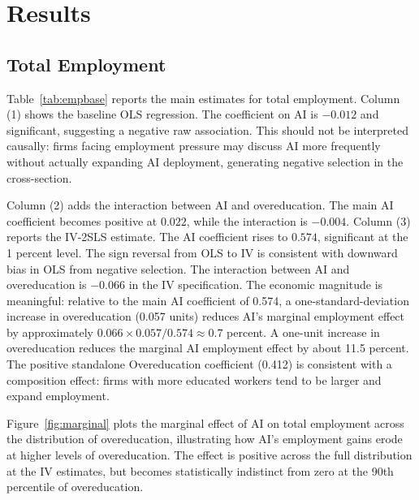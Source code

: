 \documentclass[12pt,a4paper]{article}
\theoremstyle{predstyle}
\theoremstyle{plain}
\begin{document}
\section{Results}
\label{sec:results}

\subsection{Total Employment}

Table~\ref{tab:empbase} reports the main estimates for total employment. Column (1) shows the baseline OLS regression. The coefficient on AI is \(-0.012\) and significant, suggesting a negative raw association. This should not be interpreted causally: firms facing employment pressure may discuss AI more frequently without actually expanding AI deployment, generating negative selection in the cross-section.

Column (2) adds the interaction between AI and overeducation. The main AI coefficient becomes positive at \(0.022\), while the interaction is \(-0.004\). Column (3) reports the IV-2SLS estimate. The AI coefficient rises to \(0.574\), significant at the 1 percent level. The sign reversal from OLS to IV is consistent with downward bias in OLS from negative selection. The interaction between AI and overeducation is \(-0.066\) in the IV specification. The economic magnitude is meaningful: relative to the main AI coefficient of 0.574, a one-standard-deviation increase in overeducation (0.057 units) reduces AI's marginal employment effect by approximately \(0.066 \times 0.057 / 0.574 \approx 0.7\) percent. A one-unit increase in overeducation reduces the marginal AI employment effect by about 11.5 percent. The positive standalone Overeducation coefficient (0.412) is consistent with a composition effect: firms with more educated workers tend to be larger and expand employment.

Figure~\ref{fig:marginal} plots the marginal effect of AI on total employment across the distribution of overeducation, illustrating how AI's employment gains erode at higher levels of overeducation. The effect is positive across the full distribution at the IV estimates, but becomes statistically indistinct from zero at the 90th percentile of overeducation.
\end{document}
